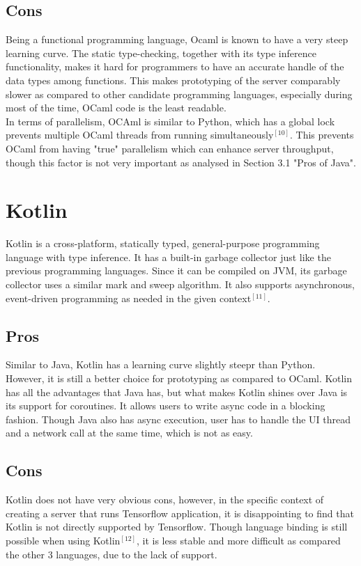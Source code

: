 \documentclass[letterpaper,twocolumn,10pt]{article}
\begin{document}
\subsection{Cons}
Being a functional programming language, Ocaml is known to have a very steep learning curve. The static type-checking, together with its type inference functionality, makes it hard for programmers to have an accurate handle of the data types among functions. This makes prototyping of the server comparably slower as compared to other candidate programming languages, especially during most of the time, OCaml code is the least readable. \\

In terms of parallelism, OCAml is similar to Python, which has a global lock prevents multiple OCaml threads from running simultaneously$^{[10]}$. This prevents OCaml from having "true" parallelism which can enhance server throughput, though this factor is not very important as analysed in Section 3.1 "Pros of Java".

\section{Kotlin}
Kotlin is a cross-platform, statically typed, general-purpose programming language with type inference. It has a built-in garbage collector just like the previous programming languages. Since it can be compiled on JVM, its garbage collector uses a similar mark and sweep algorithm. It also supports asynchronous, event-driven programming as needed in the given context$^{[11]}$.

\subsection{Pros}
Similar to Java, Kotlin has a learning curve slightly steepr than Python. However, it is still a better choice for prototyping as compared to OCaml. Kotlin has all the advantages that Java has, but what makes Kotlin shines over Java is its support for coroutines. It allows users to write async code in a blocking fashion. Though Java also has async execution, user has to handle the UI thread and a network call at the same time, which is not as easy.

\subsection{Cons}
Kotlin does not have very obvious cons, however, in the specific context of creating a server that runs Tensorflow application, it is disappointing to find that Kotlin is not directly supported by Tensorflow. Though language binding is still possible when using Kotlin$^{[12]}$, it is less stable and more difficult as compared the other 3 languages, due to the lack of support.
\end{document}
